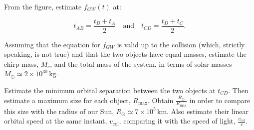 \documentclass[11pt]{article}
\begin{document}
\begin{pproblem}
\begin{alternativas}
    \item From the figure, estimate \( f_{GW}(t) \) at:

    \[
    t_{AB} = \frac{t_B + t_A}{2} \quad \text{and} \quad t_{CD} = \frac{t_D + t_C}{2}.
    \]
    
    Assuming that the equation for \(f_{GW}\) is valid up to the collision (which, strictly speaking, is not true) and that the two objects have equal masses, estimate the chirp mass, \( M_c \), and the total mass of the system, in terms of solar masses \( M_\odot \simeq 2 \times 10^{30} \, \text{kg}\).

    \item Estimate the minimum orbital separation between the two objects at \( t_{CD} \). 
    Then estimate a maximum size for each object, \( R_{\text{max}} \). 
    Obtain \( \frac{R_\odot}{R_{\text{max}}} \) in order to compare this size with the radius of our Sun, \( R_\odot \simeq 7 \times 10^5 \, \text{km} \). 
    Also estimate their linear orbital speed at the same instant, \( v_{\text{col}} \), comparing it with the speed of light, \( \frac{v_{\text{col}}}{c} \).
\end{alternativas}


\end{pproblem}
\end{document}
